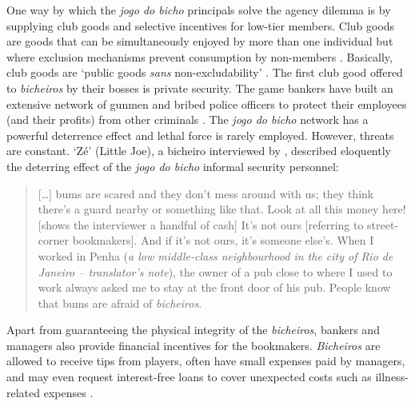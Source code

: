 One way by which the \emph{jogo do bicho} principals solve the agency dilemma is by supplying club goods and selective incentives for low-tier members. Club goods are goods that can be simultaneously enjoyed by more than one individual but where exclusion mechanisms prevent consumption by non-members \citep{buchanan1965economic, cornes1996theory, olson1965logic, sandler1980economic, sandler1997club}. Basically, club goods are `public goods \emph{sans} non-excludability' \citep[928]{mcnutt1999public}. The first club good offered to \emph{bicheiros} by their bosses is private security. The game bankers have built an extensive network of gunmen and bribed police officers to protect their employees (and their profits) from other criminals \citetext{\citealp[48]{chinelli1993vazio}; \citealp[51]{labronici2012paratodos}}. The \emph{jogo do bicho} network has a powerful deterrence effect and lethal force is rarely employed. However, threats are constant. `Zé' (Little Joe), a bicheiro interviewed by \citet[52]{labronici2012paratodos}, described eloquently the deterring effect of the \emph{jogo do bicho} informal security personnel:

\begin{quote}
 [\dots] bums are scared and they don't mess around with us; they think there's a guard nearby or something like that. Look at all this money here! [shows the interviewer a handful of cash] It's not ours [referring to street-corner bookmakers]. And if it's not ours, it's someone else's. When I worked in Penha (\emph{a low middle-class neighbourhood in the city of Rio de Janeiro -- translator's note}), the owner of a pub close to where I used to work always asked me to stay at the front door of his pub. People know that bums are afraid of \emph{bicheiros}.
\end{quote}

Apart from guaranteeing the physical integrity of the \emph{bicheiros}, bankers and managers also provide financial incentives for the bookmakers. \emph{Bicheiros} are allowed to receive tips from players, often have small expenses paid by managers, and may even request interest-free loans to cover unexpected costs such as illness-related expenses \citep{labronici2012paratodos}.

